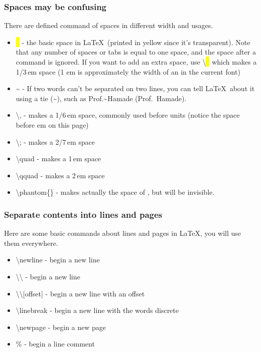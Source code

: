 \documentclass{beamer}
\newcommand{\samplecommand}[1]{\alert{\textbackslash #1}}
\begin{document}
\begin{frame}
	\frametitle{Spaces may be confusing}
	There are defined command of spaces in different width and usages.
	\begin{itemize}
		\item \colorbox{yellow}{\ } - the basic space in \LaTeX\ (printed in yellow since it's transparent). Note that any number of spaces or tabs is equal to one space, and the space after a command is ignored. If you want to add an extra space, use \alert{\textbackslash}\colorbox{yellow}{\ } which makes a 1/3\,em space (1 em is approximately the width of an  in the current font)
		\item \~{} - If two words can't be separated on two lines, you can tell \LaTeX\ about it using a tie (\~{}), such as Prof.\~{}Hamade (Prof.~Hamade).
		\item  \samplecommand{,} - makes a 1/6\,em space, commonly used before units (notice the space before em on this page)
		\item  \samplecommand{;} - makes a 2/7\,em space
		\item  \samplecommand{quad} - makes a 1\,em space
		\item  \samplecommand{qquad} - makes a 2\,em space
		\item  \samplecommand{phantom}\{\} - makes actually the space of , but  will be invisible.
	\end{itemize}
\end{frame}

\begin{frame}
	\frametitle{Separate contents into lines and pages}
	Here are some basic commands about lines and pages in \LaTeX, you will use them everywhere.
	\begin{itemize}
		\item \samplecommand{newline} - begin a new line
		\item \alert{\textbackslash\textbackslash} - begin a new line
		\item \alert{\textbackslash\textbackslash[offset]} - begin a new line with an offset
		\item \samplecommand{linebreak} - begin a new line with the words discrete
		\item \samplecommand{newpage} - begin a new page
		\item \alert{\%} - begin a line comment
	\end{itemize}
\end{frame}
\end{document}
